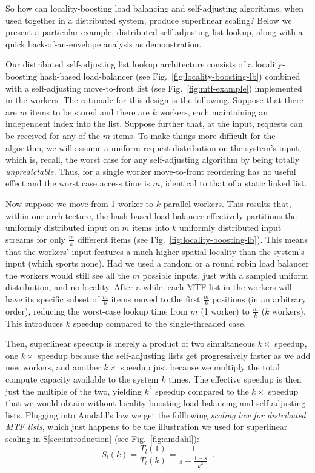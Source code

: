 So how can locality-boosting load balancing and self-adjusting algorithms, when used together in a distributed system, produce superlinear scaling? Below we present a particular example, distributed self-adjusting list lookup, along with a quick back-of-an-envelope analysis as demonstration.

Our distributed self-adjusting list lookup architecture consists of a locality-boosting hash-based load-balancer (see Fig.~\ref{fig:locality-boosting-lb}) combined with a self-adjusting move-to-front list (see Fig.~\ref{fig:mtf-example}) implemented in the workers. The rationale for this design is the following. Suppose that there are $m$ items to be stored and there are $k$ workers, each maintaining an independent index into the list. Suppose further that, at the input, requests can be received for any of the $m$ items. To make things more difficult for the algorithm, we will assume a uniform request distribution on the system's input, which is, recall, the worst case for any self-adjusting algorithm by being totally \emph{unpredictable}. Thus, for a single worker move-to-front reordering has no useful effect and the worst case access time is $m$, identical to that of a static linked list.

Now suppose we move from 1 worker to $k$ parallel workers. This results that, within our architecture, the hash-based load balancer effectively partitions the uniformly distributed input on $m$ items into $k$ uniformly distributed input streams for only $\frac{m}{k}$ different items (see Fig.~\ref{fig:locality-boosting-lb}). This means that the workers' input features a much higher spatial locality than the system's input (which sports none).  Had we used a random or a round robin load balancer the workers would still see all the $m$ possible inputs, just with a sampled uniform distribution, and no locality. After a while, each MTF list in the workers will have its specific subset of $\frac{m}{k}$ items moved to the first $\frac{m}{k}$ positions (in an arbitrary order), reducing the worst-case lookup time from $m$ (1 worker) to $\frac{m}{k}$ ($k$ workers). This introduces $k$ speedup compared to the single-threaded case.

Then, superlinear speedup is merely a product of two simultaneous $k\times$ speedup, one $k\times$ speedup because the self-adjusting lists get progressively faster as we add new workers, and another $k\times$ speedup just because we multiply the total compute capacity available to the system $k$ times. The effective speedup is then just the multiple of the two, yielding $k^2$ speedup compared to the $k\times$ speedup that we would obtain without locality boosting load balancing and self-adjusting lists. Plugging into Amdahl's law we get the folllowing \emph{scaling law for distributed MTF lists}, which just happens to be the illustration we used for superlinear scaling in S\ref{sec:introduction} (see Fig.~\ref{fig:amdahl}):
\begin{equation}\label{eq:mtf-perf}
  S_l(k) = \frac{T_l(1)}{T_l(k)} = \frac1{s + \frac{1-s}{k^2}} \enspace .
\end{equation}

